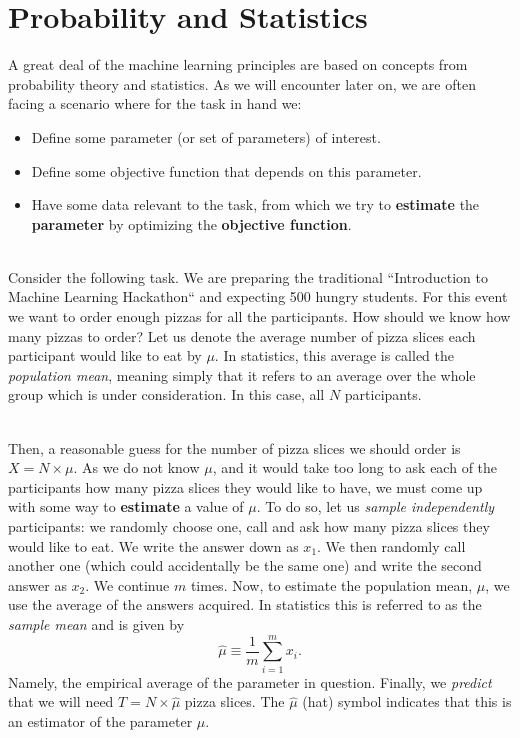 \section{Probability and Statistics}
A great deal of the machine learning principles are based on concepts from probability theory and statistics. As we will encounter later on, we are often facing a scenario where for the task in hand we:
\begin{itemize}
	\item Define some parameter (or set of parameters) of interest.
	\item Define some objective function that depends on this parameter. 
	\item Have some data relevant to the task, from which we try to \textbf{estimate} the \textbf{parameter} by optimizing the \textbf{objective function}.
\end{itemize}

~\\Consider the following task. We are preparing the traditional ``Introduction to Machine Learning Hackathon`` and expecting 500 hungry students. For this event we want to order enough pizzas for all the participants. How should we know how many pizzas to order? Let us denote the average number of pizza slices each participant would like to eat by $\mu$. In statistics, this average is called the \textit{population mean}, meaning simply that it refers to an average over the whole group which is under consideration. In this case, all $N$ participants.

~\\Then, a reasonable guess for the number of pizza slices we should order is $X=N \times\mu$. As we do not know $\mu$, and it would take too long to ask each of the participants how many pizza slices they would like to have, we must come up with some way to \textbf{estimate} a value of $\mu$. To do so, let us \textit{sample independently} participants: we randomly choose one, call and ask how many pizza slices they would like to eat. We write the answer down as $x_1$. We then randomly call another one (which could accidentally be the same one) and write the second answer as $x_2$. We continue $m$ times. Now, to estimate the population mean, $\mu$, we use the average of the answers acquired. In statistics this is referred to as the \textit{sample mean} and is given by
$$\widehat{\mu} \equiv \frac{1}{m}\sum_{i=1}^{m}x_i.$$
Namely, the empirical average of the parameter in question. Finally, we \textit{predict} that we will need $T= N \times \widehat{\mu}$ pizza slices. The $\widehat{\mu}$ (hat) symbol indicates that this is an estimator of the parameter $\mu$.

